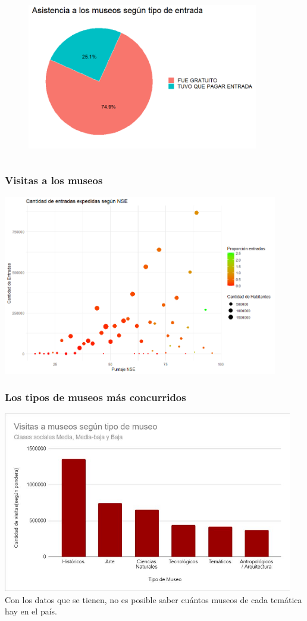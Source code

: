 \documentclass[10pt]{beamer}
\begin{document}
\begin{frame}
\begin{columns}
      \begin{figure}
        \vspace{-2.25em}
        \includegraphics[width=0.9\textwidth]{entradas.png}
      \end{figure}
  \end{columns}
\end{frame}


\begin{frame}
  \frametitle{Visitas a los museos}

    \includegraphics[width=0.9\textwidth]{entradas_nse}
\end{frame}


\begin{frame}
  \frametitle{Los tipos de museos más concurridos}

    \includegraphics[width=0.95\textwidth]{visitas.jpg}
    Con los datos que se tienen, no es posible saber cuántos museos de cada temática hay en el país.
\end{frame}
\end{document}
